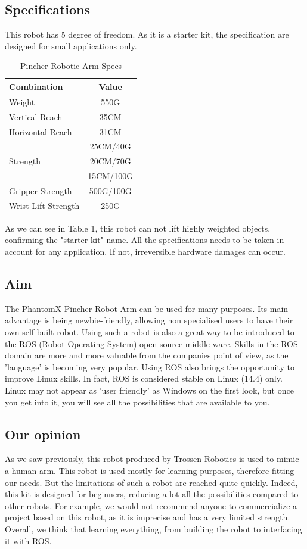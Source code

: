 \documentclass[aps,letterpaper,11pt]{revtex4}
\begin{document}
\subsection{Specifications}
This robot has 5 degree of freedom. As it is a starter kit, the specification are designed for small applications only.

\begin{table}[h!]
\begin{tabular}[t]{|l |c|}\hline
Combination & Value \\
\hline 
\hline 
 Weight & 550G\\
 \hline 
 Vertical Reach & 35CM\\
 \hline 
 Horizontal Reach & 31CM\\
 \hline 
  & 25CM/40G\\
  Strength & 20CM/70G\\
  & 15CM/100G\\
  \hline 
 Gripper Strength & 500G/100G\\
 \hline 
 Wrist Lift Strength & 250G\\

\hline
\end{tabular}
\caption{Pincher Robotic Arm Specs} 
\label{tab:Arm_Specs}
\end{table}

As we can see in Table 1, this robot can not lift highly weighted objects, confirming the "starter kit" name. All the specifications needs to be taken in account for any application. If not, irreversible hardware damages can occur. 

\subsection{Aim}
The PhantomX Pincher Robot Arm can be used for many purposes. Its main advantage is being newbie-friendly, allowing non specialised users to have their own self-built robot. Using such a robot is also a great way to be introduced to the ROS (Robot Operating System) open source middle-ware. Skills in the ROS domain are more and more valuable from the companies point of view, as the 'language' is becoming very popular. Using ROS also brings the opportunity to improve Linux skills. In fact, ROS is considered stable on Linux (14.4) only. Linux may not appear as 'user friendly' as Windows on the first look, but once you get into it, you will see all the possibilities that are available to you. 

	
\subsection{Our opinion}
As we saw previously, this robot produced by Trossen Robotics is used to mimic a human arm. This robot is used mostly for learning purposes, therefore fitting our needs. But the limitations of such a robot are reached quite quickly. Indeed, this kit is designed for beginners, reducing a lot all the possibilities compared to other robots. For example, we would not recommend anyone to commercialize a project based on this robot, as it is imprecise and has a very limited strength. Overall, we think that learning everything, from building the robot to interfacing it with ROS.
\end{document}
